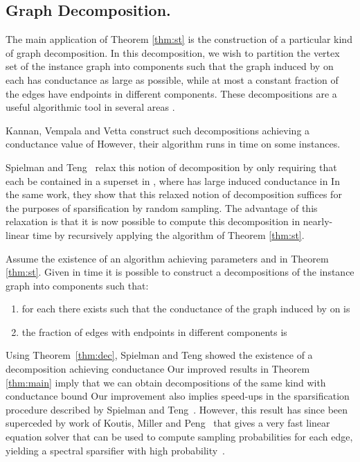 \documentclass[twoside,leqno,twocolumn]{article}
\numberwithin{equation}{section}
\begin{document}
\subsection{Graph Decomposition.} The main application of Theorem \ref{thm:st} is the construction of a particular kind of graph decomposition. In this decomposition, we wish to partition the vertex set of the instance graph  into components  such that the graph induced by  on each  has conductance as large as possible, while at most a constant fraction of the edges have endpoints in different components. These decompositions are a useful algorithmic tool in several areas \cite{Trevisan05, KM, ST2}.

Kannan, Vempala and Vetta \cite{Kannan} construct such decompositions achieving a conductance value of  However, their algorithm runs in time  on some instances. 

Spielman and Teng~\cite{ST2} relax this notion of decomposition by only requiring that each  be contained in a superset  in , where  has large induced conductance in  In the same work, they show that this relaxed notion of decomposition suffices for the purposes of sparsification by random sampling. The advantage of this relaxation is that it is now possible to compute this decomposition in nearly-linear time by recursively applying the algorithm of Theorem \ref{thm:st}.
\begin{theorem} \label{thm:dec} \cite{ST2} 
Assume the existence of an algorithm achieving parameters  and  in Theorem \ref{thm:st}. Given  in time  it is possible to construct a decompositions of the instance graph  into components  such that:
\begin{enumerate}
\item for each  there exists  such that the conductance of the graph induced by  on  is  
\item the fraction of edges with endpoints in different components is 
\end{enumerate}
\end{theorem}
Using Theorem~\ref{thm:dec}, Spielman and Teng showed the existence of a decomposition achieving conductance 
Our improved results in Theorem \ref{thm:main} imply that we can obtain decompositions of the same kind with conductance  bound  Our improvement also implies speed-ups in the sparsification procedure described by Spielman and Teng~\cite{ST2}. However, this result has since been superceded by work of Koutis, Miller and Peng~\cite{KMP} that gives a very fast linear equation solver that can be used to compute sampling probabilities for each edge, yielding a spectral sparsifier with high probability~\cite{SS}.
\end{document}
